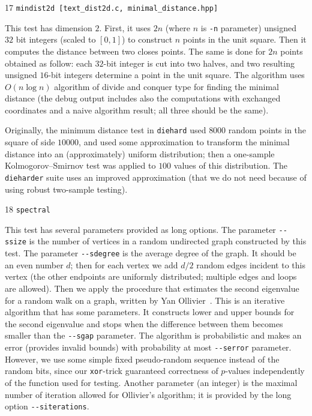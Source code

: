 \documentclass[12pt,a4paper,fullpage]{article}
\begin{document}
\begin{description}
\item{17} \texttt{mindist2d [text\_dist2d.c, minimal\_distance.hpp]}

This test has dimension $2$. First, it uses $2n$ (where $n$ is \texttt{-n} parameter) unsigned $32$ bit integers (scaled to $[0,1]$) to construct $n$ points in the unit square. Then it computes the distance between two closes points. The same is done for $2n$ points obtained as follow: each $32$-bit integer is cut into two halves, and two resulting unsigned $16$-bit integers determine a point in the unit square. The algorithm uses $O(n\log n)$ algorithm of divide and conquer type for finding the minimal distance (the debug output includes also the computations with exchanged coordinates and a naive algorithm result; all three should be the same).

Originally, the minimum distance test in \texttt{diehard} used $8000$ random points in the square of side $10000$, and used some approximation to transform the minimal distance into an (approximately) uniform distribution; then a one-sample Kolmogorov--Smirnov test was applied to $100$ values of this distribution. The \texttt{dieharder} suite uses an improved approximation (that we do not need because of using robust two-sample testing).

\item{18} \texttt{spectral}

This test has several parameters provided as long options. The parameter \texttt{{-}-ssize} is the number of vertices in a random undirected graph constructed by this test. The parameter \texttt{{-}-sdegree} is the average degree of the graph. It should be an even number $d$; then for each vertex we add $d/2$ random edges incident to this vertex (the other endpoints are uniformly distributed; multiple edges and loops are allowed). Then we apply the procedure that estimates the second eigenvalue for a random walk on a graph, written by Yan Ollivier~\cite{ollivier}. This is an iterative algorithm that has some parameters. It constructs lower and upper bounds for the second eigenvalue and stops when the difference between them becomes smaller than the \texttt{{-}-sgap} parameter. The algorithm is probabilistic and makes an error (provides invalid bounds) with probability at most \texttt{{-}-serror} parameter. However, we use some simple fixed pseudo-random sequence instead of the random bits, since our \texttt{xor}-trick guaranteed correctness of $p$-values independently of the function used for testing. Another parameter (an integer) is the maximal number of iteration allowed for Ollivier's algorithm; it is provided by the long option \texttt{{-}-siterations}. 


\end{description}
\end{document}
